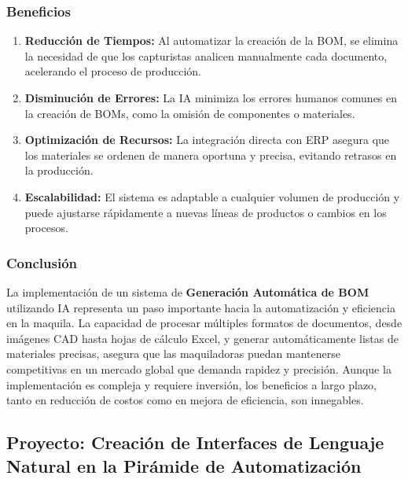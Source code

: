 \documentclass[
  10pt,
  letterpaper,
]{book}
\providecommand{\tightlist}{%
  \setlength{\itemsep}{0pt}\setlength{\parskip}{0pt}}\usepackage{longtable,booktabs,array}
\begin{document}
\subsubsection{Beneficios}\label{beneficios}

\begin{enumerate}
\def\labelenumi{\arabic{enumi}.}
\tightlist
\item
  \textbf{Reducción de Tiempos:} Al automatizar la creación de la BOM,
  se elimina la necesidad de que los capturistas analicen manualmente
  cada documento, acelerando el proceso de producción.
\item
  \textbf{Disminución de Errores:} La IA minimiza los errores humanos
  comunes en la creación de BOMs, como la omisión de componentes o
  materiales.
\item
  \textbf{Optimización de Recursos:} La integración directa con ERP
  asegura que los materiales se ordenen de manera oportuna y precisa,
  evitando retrasos en la producción.
\item
  \textbf{Escalabilidad:} El sistema es adaptable a cualquier volumen de
  producción y puede ajustarse rápidamente a nuevas líneas de productos
  o cambios en los procesos.
\end{enumerate}

\subsubsection{Conclusión}\label{conclusiuxf3n-2}

La implementación de un sistema de \textbf{Generación Automática de BOM}
utilizando IA representa un paso importante hacia la automatización y
eficiencia en la maquila. La capacidad de procesar múltiples formatos de
documentos, desde imágenes CAD hasta hojas de cálculo Excel, y generar
automáticamente listas de materiales precisas, asegura que las
maquiladoras puedan mantenerse competitivas en un mercado global que
demanda rapidez y precisión. Aunque la implementación es compleja y
requiere inversión, los beneficios a largo plazo, tanto en reducción de
costos como en mejora de eficiencia, son innegables.

\subsection{\texorpdfstring{Proyecto: \textbf{Creación de Interfaces de
Lenguaje Natural en la Pirámide de
Automatización}}{Proyecto: Creación de Interfaces de Lenguaje Natural en la Pirámide de Automatización}}\label{proyecto-creaciuxf3n-de-interfaces-de-lenguaje-natural-en-la-piruxe1mide-de-automatizaciuxf3n}
\end{document}
